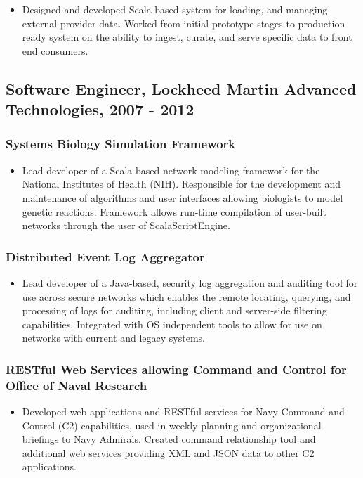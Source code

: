 \documentclass[11pt]{article}
\begin{document}
\begin{itemize}
\item Designed and developed Scala-based system for loading, and managing external provider data. Worked from initial prototype stages to production ready system on the ability to ingest, curate, and serve specific data to front end consumers.
\end{itemize}
\subsection*{Software Engineer, Lockheed Martin Advanced Technologies, 2007 - 2012}
\label{sec-1-4}
\subsubsection*{Systems Biology Simulation Framework}
\label{sec-1-4-1}

\begin{itemize}
\item Lead developer of a Scala-based network modeling framework for the National Institutes of Health (NIH). Responsible for the development and maintenance of algorithms and user interfaces allowing biologists to model genetic reactions. Framework allows run-time compilation of user-built networks through the user of ScalaScriptEngine.
\end{itemize}
\subsubsection*{Distributed Event Log Aggregator}
\label{sec-1-4-2}

\begin{itemize}
\item Lead developer of a Java-based, security log aggregation and auditing tool for use across secure networks which enables the remote locating, querying, and processing of logs for auditing, including client and server-side filtering capabilities. Integrated with OS independent tools to allow for use on networks with current and legacy systems.
\end{itemize}
\subsubsection*{RESTful Web Services allowing Command and Control for Office of Naval Research}
\label{sec-1-4-3}

\begin{itemize}
\item Developed web applications and RESTful services for Navy Command and Control (C2) capabilities, used in weekly planning and organizational briefings to Navy Admirals. Created command relationship tool and additional web services providing XML and JSON data to other C2 applications.
\end{itemize}
\end{document}

